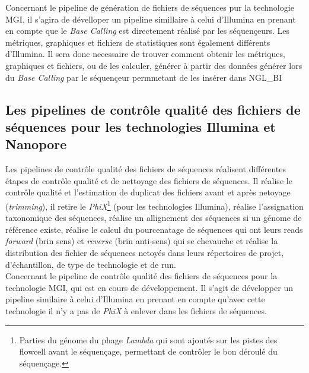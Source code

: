 Concernant le pipeline de génération de fichiers de séquences pur la technologie MGI, il s'agira de dévelloper un pipeline simillaire à celui d'Illumina en prenant en compte que le \emph{Base Calling} est directement réalisé par les séquençeurs. Les métriques, graphiques et fichiers de statistiques sont également différents d'Illumina. Il sera donc necessaire de trouver comment obtenir les métriques, graphiques et fichiers, ou de les calculer, générer à partir des données générer lors du \emph{Base Calling} par le séquençeur permmetant de les insérer dans NGL\_BI

\newpage
\subsection{Les pipelines de contrôle qualité des fichiers de séquences pour les technologies Illumina et Nanopore}
Les pipelines de contrôle qualité des fichiers de séquences réalisent différentes étapes de contrôle qualité et de nettoyage des fichiers de séquences. Il réalise le contrôle qualité et l'estimation de duplicat des fichiers avant et après netoyage (\emph{trimming}), il retire le \emph{PhiX}\footnote{Parties du génome du phage \emph{Lambda} qui sont ajoutés sur les pistes des flowcell avant le séquençage, permettant de contrôler le bon déroulé du séquençage.} (pour les technologies Illumina), réalise l'assignation taxonomique des séquences, réalise un allignement des séquences si un génome de référence existe, réalise le calcul du pourcenatage de séquences qui ont leurs reads \emph{forward} (brin sens) et \emph{reverse} (brin anti-sens) qui se chevauche et réalise la distribution des fichier de séquences netoyés dans leurs répertoires de projet, d'échantillon, de type de technologie et de run.\\

Concernant le pipeline de contrôle qualité des fichiers de séquences pour la technologie MGI, qui est en cours de développement. Il s'agit de développer un pipeline similaire à celui d'Illumina en prenant en compte qu'avec cette technologie il n'y a pas de \emph{PhiX} à enlever dans les fichiers de séquences.